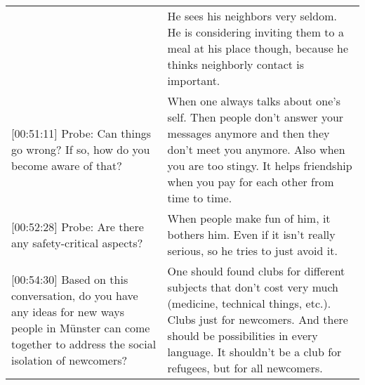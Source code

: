 \begin{longtable}{p{}p{}}
                                                                                                                                                                & He sees his neighbors very seldom. He is considering inviting them to a meal at his place though, because he thinks neighborly contact is important.                                                                                                                                                                                                                                                                                                                                                                                                                                            \\
{[}00:51:11{]} Probe: Can things go wrong? If so, how do you become aware of that?                                                                              & When one always talks about one's self. Then people don't answer your messages anymore and then they don't meet you anymore. Also when you are too stingy. It helps friendship when you pay for each other from time to time.                                                                                                                                                                                                                                                                                                                                                                   \\
{[}00:52:28{]} Probe: Are there any safety-critical aspects?                                                                                                    & When people make fun of him, it bothers him. Even if it isn't really serious, so he tries to just avoid it.                                                                                                                                                                                                                                                                                                                                                                                                                                                                                     \\
{[}00:54:30{]} Based on this conversation, do you have any ideas for new ways people in Münster can come together to address the social isolation of newcomers? & One should found clubs for different subjects that don't cost very much (medicine, technical things, etc.). Clubs just for newcomers. And there should be possibilities in every language. It shouldn't be a club for refugees, but for all newcomers.                                                                                                                                                                                                                                                                                                                                          \\
\end{longtable}

\renewcommand{\arraystretch}{1}

